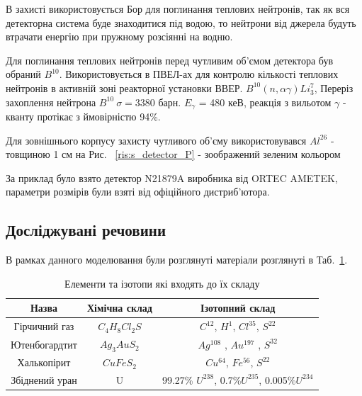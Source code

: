 \documentclass[a4paper, 14pt]{article}
\numberwithin{equation}{section}
\numberwithin{table}{section}
\begin{document}
	В захисті використовується Бор для поглинання теплових нейтронів, так як вся детекторна система буде знаходитися під водою, то нейтрони від джерела будуть втрачати енергію при пружному розсіянні на водню. 
	
	Для поглинання теплових нейтронів перед чутливим об'ємом детектора був обраний $B^{10}$. Використовується в ПВЕЛ-ах для контролю кількості теплових нейтронів в активній зоні реакторної установки ВВЕР. 
	$B^{10} ( n, \alpha \gamma)Li_3^7$, Переріз захоплення нейтрона $B^{10} \ \sigma = 3380$ барн.
	$E_\gamma$ = 480 кеВ, реакція з вильотом $\gamma$ - кванту протікає з ймовірністю 94\%.
	
	Для зовнішнього корпусу захисту чутливого об'єму використовувався $Al^{26}$ - товщиною 1 см на Рис. ~\ref{ris:s_detector_P} - зоображений зеленим кольором 
	
	За приклад було взято детектор N21879A виробника від ORTEC AMETEK, параметри розмірів були взяті від офіційного дистриб'ютора.
	\subsection{Досліджувані речовини} 
	
	
	В рамках данного моделювання були розглянуті матеріали розглянуті в Таб.~\ref{tabl:Materials}.
	\begin{table}[h]
		\centering
		\caption{Елементи та ізотопи які входять до їх складу} 
		\begin{tabular}{|c|c|c|}
			\hline
			Назва & Хімічна склад & Ізотопний склад \\
			\hline
			Гірчичний газ & $C_4H_8Cl_2S$ & $C^{12}$, 	$H^1$, $Cl^{35}$, $S^{22}$ \\
			\hline
			Ютенбогардтит & $Ag_3AuS_2$ & $Ag^{108}$ , $Au^{197}$ , $S^{32}$ \\
			\hline
			Халькопірит & $CuFeS_2$ & $Cu^{64}$, $Fe^{56}$, $S^{22}$ \\
			\hline
			Збіднений уран & U & 99.27\% $U^{238}$, 0.7\%$U^{235}$, 0.005\%$U^{234}$\\
			\hline
		\end{tabular}
		\label{tabl:Materials}
	\end{table}
	
\end{document}
